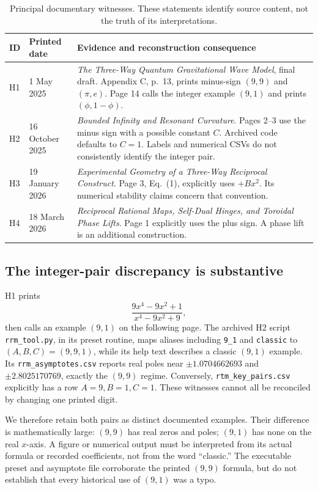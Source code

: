 \begin{table}[htbp]\centering\small
\begin{tabularx}{\linewidth}{L{12mm}L{26mm}Y}
\toprule ID & Printed date & Evidence and reconstruction consequence\\\midrule
H1 & 1 May 2025 & \emph{The Three-Way Quantum Gravitational Wave Model}, final draft. Appendix C, p.~13, prints minus-sign \((9,9)\) and \((\pi,e)\). Page 14 calls the integer example \((9,1)\) and prints \((\phi,1-\phi)\).\\
H2 & 16 October 2025 & \emph{Bounded Infinity and Resonant Curvature}. Pages 2--3 use the minus sign with a possible constant \(C\). Archived code defaults to \(C=1\). Labels and numerical CSVs do not consistently identify the integer pair.\\
H3 & 19 January 2026 & \emph{Experimental Geometry of a Three-Way Reciprocal Construct}. Page 3, Eq.~(1), explicitly uses \(+Bx^2\). Its numerical stability claims concern that convention.\\
H4 & 18 March 2026 & \emph{Reciprocal Rational Maps, Self-Dual Hinges, and Toroidal Phase Lifts}. Page 1 explicitly uses the plus sign. A phase lift is an additional construction.\\\bottomrule
\end{tabularx}
\caption{Principal documentary witnesses. These statements identify source content, not the truth of its interpretations.}\label{tab:provenance}
\end{table}

\subsection{The integer-pair discrepancy is substantive}
H1 prints
\begin{equation}\label{eq:historical99}
\frac{9x^4-9x^2+1}{x^4-9x^2+9},
\end{equation}
then calls an example \((9,1)\) on the following page. The archived H2 script \texttt{rrm\_tool.py}, in its preset routine, maps aliases including \texttt{9\_1} and \texttt{classic} to \((A,B,C)=(9,9,1)\), while its help text describes a classic \((9,1)\) example. Its \texttt{rrm\_asymptotes.csv} reports real poles near \(\pm1.0704662693\) and \(\pm2.8025170769\), exactly the \((9,9)\) regime. Conversely, \texttt{rtm\_key\_pairs.csv} explicitly has a row \(A=9,B=1,C=1\). These witnesses cannot all be reconciled by changing one printed digit.

We therefore retain both pairs as distinct documented examples. Their difference is mathematically large: \((9,9)\) has real zeros and poles; \((9,1)\) has none on the real \(x\)-axis. A figure or numerical output must be interpreted from its actual formula or recorded coefficients, not from the word ``classic.'' The executable preset and asymptote file corroborate the printed \((9,9)\) formula, but do not establish that every historical use of \((9,1)\) was a typo.

